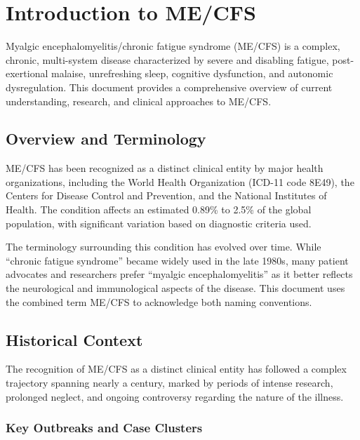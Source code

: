 \chapter{Introduction to ME/CFS}
\label{ch:introduction}
Myalgic encephalomyelitis/chronic fatigue syndrome (ME/CFS) is a complex, chronic, multi-system disease characterized by severe and disabling fatigue, post-exertional malaise, unrefreshing sleep, cognitive dysfunction, and autonomic dysregulation. This document provides a comprehensive overview of current understanding, research, and clinical approaches to ME/CFS.

\section{Overview and Terminology}
\label{sec:terminology}

ME/CFS has been recognized as a distinct clinical entity by major health organizations, including the World Health Organization (ICD-11 code 8E49), the Centers for Disease Control and Prevention, and the National Institutes of Health. The condition affects an estimated 0.89\% to 2.5\% of the global population, with significant variation based on diagnostic criteria used.

The terminology surrounding this condition has evolved over time. While ``chronic fatigue syndrome'' became widely used in the late 1980s, many patient advocates and researchers prefer ``myalgic encephalomyelitis'' as it better reflects the neurological and immunological aspects of the disease. This document uses the combined term ME/CFS to acknowledge both naming conventions.

\section{Historical Context}
\label{sec:history}

The recognition of ME/CFS as a distinct clinical entity has followed a complex trajectory spanning nearly a century, marked by periods of intense research, prolonged neglect, and ongoing controversy regarding the nature of the illness.

\subsection{Key Outbreaks and Case Clusters}
\label{subsec:outbreaks}

